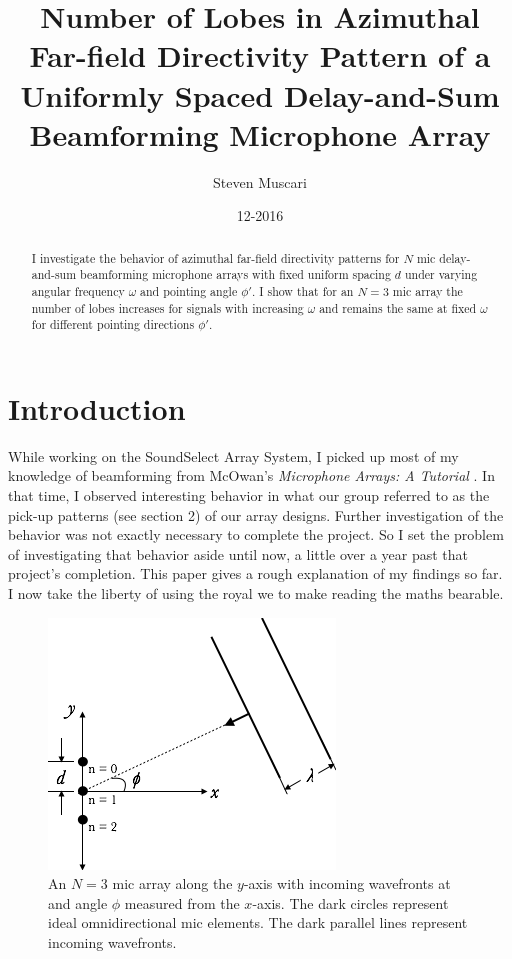 \documentclass{article}
\title{Number of Lobes in Azimuthal Far-field Directivity Pattern of a Uniformly Spaced Delay-and-Sum Beamforming Microphone Array}
\date{12-2016}
\author{Steven Muscari}
\begin{document}
\maketitle

\begin{abstract}
  I investigate the behavior of azimuthal far-field directivity patterns for $N$ mic
  delay-and-sum beamforming microphone arrays with fixed uniform spacing $d$ under
  varying angular frequency $\omega$ and pointing angle $\phi'$. I show that for an
  $N=3$ mic array the number of lobes increases for signals with increasing $\omega$
  and remains the same at fixed $\omega$ for different pointing directions $\phi'$.
\end{abstract}

\section{Introduction}

  While working on the SoundSelect Array System, I picked up most of my
  knowledge of beamforming from McOwan's \emph{Microphone Arrays: A Tutorial} \cite{mccowan}.
  In that time, I observed interesting behavior in what our group referred to as the pick-up
  patterns (see section 2) of our array designs. Further investigation of the behavior was not
  exactly necessary to complete the project. So I set the problem of investigating that behavior aside
  until now, a little over a year past that project's completion. This paper gives a rough explanation of
  my findings so far. I now take the liberty of using the royal we to make reading the maths bearable.

  \begin{figure}[ht]
    \centering
    \includegraphics[scale=0.5]{fig1}
    \caption{An $N=3$ mic array along the $y$-axis with incoming wavefronts at and angle $\phi$
             measured from the $x$-axis. The dark circles represent ideal omnidirectional mic elements.
             The dark parallel lines represent incoming wavefronts.}
  \end{figure}
\end{document}
